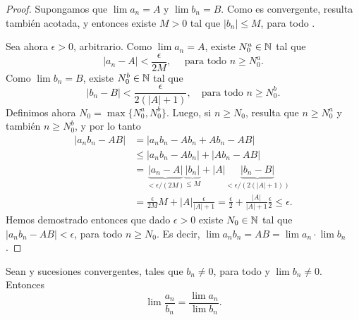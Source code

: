 \begin{proof}
Supongamos que $\lim a_n = A$ y $\lim b_n = B$.
Como \sucbn es convergente, resulta también acotada, y entonces existe $M > 0$ tal que $|b_n|\le M$, para todo \niN.

Sea ahora $\epsilon > 0$, arbitrario.
Como $\lim a_n = A$, existe $N_0^a \in \mathbb{N}$ tal que 
\[
|a_n - A| < \frac{\epsilon}{2M} ,\quad\text{ para todo $n\ge N_0^a$}.
\]
Como $\lim b_n = B$, existe $N_0^b \in \mathbb{N}$ tal que 
\[
|b_n - B| < \frac{\epsilon}{2(|A|+1)}, \quad\text{para todo $n\ge N_0^b$}.
\]
Definimos ahora $N_0 = \max\{N_0^a,N_0^b\}$. Luego, si $n\ge N_0$, resulta que $n\ge N_0^a$ y también $n \ge N_0^b$, y por lo tanto
\begin{align*}
|a_n b_n - A B | 
&= | a_n b_n - A b_n  + A b_n - AB| 
\\
&\le  | a_n b_n - A b_n | + |A b_n - AB| 
\\
&= \underbrace{|a_n - A|}_{<\epsilon/(2M)} \underbrace{|b_n|}_{\le M} + |A| \underbrace{|b_n - B|}_{<\epsilon/(2(|A|+1))}
\\
&= \frac{\epsilon}{2M} M + |A| \frac{\epsilon}{|A|+1} 
= \frac{\epsilon}2 + \frac{|A|}{|A|+1} \frac{\epsilon}2
\le \epsilon. 
\end{align*}
Hemos demostrado entonces que dado $\epsilon > 0$ existe $N_0\in\mathbb{N}$ tal que $|a_nb_n - AB| < \epsilon$, para todo $n \ge N_0$. Es decir, $\lim a_nb_n = AB = \lim a_n \cdot \lim b_n$.
\end{proof}


\begin{proposition}\label{P:suc-lim-cociente}
    Sean \sucan y \sucbn sucesiones convergentes, tales que $b_n\neq 0$, para todo \niN y $\lim b_n \neq 0$.
    Entonces
    \[
    \lim \frac{a_n}{b_n} = \frac{\lim a_n}{\lim b_n}.
    \]
\end{proposition}

